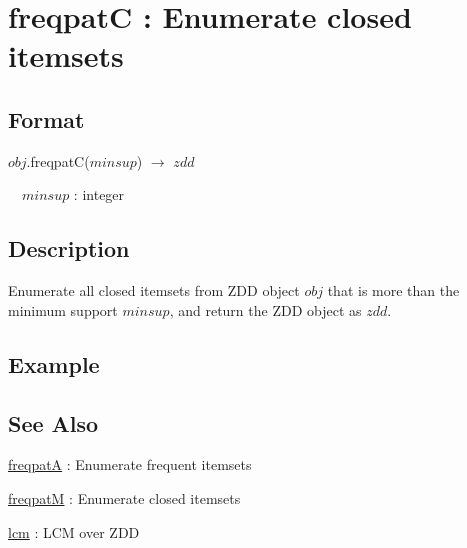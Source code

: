 
\section{freqpatC : Enumerate closed itemsets \label{sect:freqpatC}}
\subsection*{Format}
$obj$.freqpatC($minsup$) $\rightarrow$ $zdd$ 

~~$minsup$ : integer

\subsection*{Description}
Enumerate all closed itemsets from ZDD object $obj$ that is more than the minimum support $minsup$, and return the ZDD object as $zdd$. 

\subsection*{Example}


\subsection*{See Also}
\hyperref[sect:freqpatA]{freqpatA} : Enumerate frequent itemsets

\hyperref[sect:freqpatM]{freqpatM} : Enumerate closed itemsets 

\hyperref[sect:lcm]{lcm} : LCM over ZDD
